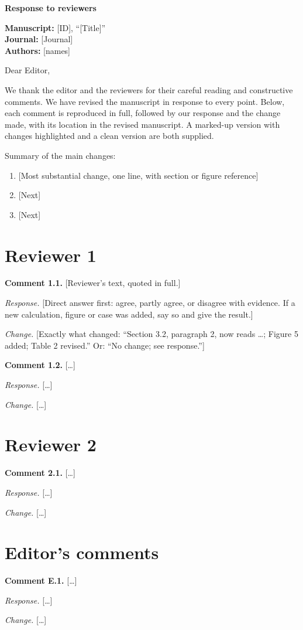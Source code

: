 \documentclass[11pt,a4paper]{article}
\newcommand{\comment}[2]{%
  \begin{shaded}\noindent\textbf{Comment #1.} #2\end{shaded}}
\newcommand{\response}[1]{\noindent\emph{Response.} #1\par\medskip}
\newcommand{\change}[1]{\noindent\emph{Change.} #1\par\bigskip}
\begin{document}
\begin{center}
  {\Large\bfseries Response to reviewers}
\end{center}

\noindent\textbf{Manuscript:} [ID], ``[Title]''\\
\textbf{Journal:} [Journal]\\
\textbf{Authors:} [names]

\vspace{1em}
\noindent Dear Editor,

We thank the editor and the reviewers for their careful reading and constructive comments. We have revised the manuscript in response to every point. Below, each comment is reproduced in full, followed by our response and the change made, with its location in the revised manuscript. A marked-up version with changes highlighted and a clean version are both supplied.

Summary of the main changes:
\begin{enumerate}
  \item {[Most substantial change, one line, with section or figure reference]}
  \item {[Next]}
  \item {[Next]}
\end{enumerate}

\section*{Reviewer 1}

\comment{1.1}{[Reviewer's text, quoted in full.]}
\response{[Direct answer first: agree, partly agree, or disagree with evidence. If a new calculation, figure or case was added, say so and give the result.]}
\change{[Exactly what changed: ``Section 3.2, paragraph 2, now reads \ldots; Figure 5 added; Table 2 revised.'' Or: ``No change; see response.'']}

\comment{1.2}{[\ldots]}
\response{[\ldots]}
\change{[\ldots]}

\section*{Reviewer 2}

\comment{2.1}{[\ldots]}
\response{[\ldots]}
\change{[\ldots]}

\section*{Editor's comments}

\comment{E.1}{[\ldots]}
\response{[\ldots]}
\change{[\ldots]}
\end{document}
